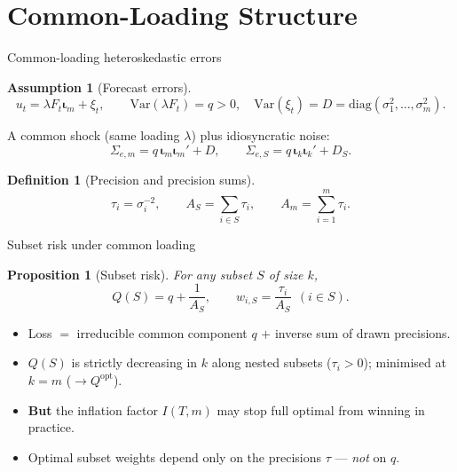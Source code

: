 \documentclass[11pt,aspectratio=169]{beamer}
\newcommand{\Sig}{\Sigma_{e,m}}
\newcommand{\Qopt}{Q^{\mathrm{opt}}}
\newcommand{\Var}{\mathrm{Var}}
\newcommand{\im}{\bm{\iota}_m}
\newcommand{\ik}{\bm{\iota}_k}
\newtheorem{assumptionX}{Assumption}
\newtheorem{propositionX}{Proposition}
\newtheorem{definitionX}{Definition}
\begin{document}
\section{Common-Loading Structure}

\begin{frame}{Common-loading heteroskedastic errors}
  \begin{assumptionX}[Forecast errors]
    \[
      u_t=\lambda F_t\im+\xi_t,\qquad
      \Var(\lambda F_t)=q>0,\quad
      \Var(\xi_t)=D=\mathrm{diag}(\sigma_1^2,\dots,\sigma_m^2).
    \]
  \end{assumptionX}
  A common shock (same loading $\lambda$) plus idiosyncratic noise:
  \[
    \Sig=q\,\im\im'+D,\qquad
    \Sigma_{e,S}=q\,\ik\ik'+D_S .
  \]
  \begin{definitionX}[Precision and precision sums]
    \[
      \tau_i=\sigma_i^{-2},\qquad
      A_S=\sum_{i\in S}\tau_i,\qquad
      A_m=\sum_{i=1}^m\tau_i .
    \]
  \end{definitionX}
\end{frame}

\begin{frame}{Subset risk under common loading}
  \begin{propositionX}[Subset risk]
    For any subset $S$ of size $k$,
    \[
      Q(S)=q+\frac{1}{A_S},
      \qquad
      w_{i,S}=\frac{\tau_i}{A_S}\ \ (i\in S).
    \]
  \end{propositionX}
  \begin{itemize}
    \item Loss $=$ irreducible common component $q$ $+$ inverse sum of
      drawn precisions.
    \item $Q(S)$ is strictly decreasing in $k$ along nested subsets ($\tau_i>0$);
      minimised at $k=m$ ($\to\Qopt$).
    \item \textbf{But} the inflation factor $I(T,m)$ may stop full optimal
      from winning in practice.
    \item Optimal subset weights depend only on the precisions $\tau$ ---
      \emph{not} on $q$.
  \end{itemize}
\end{frame}
\end{document}
